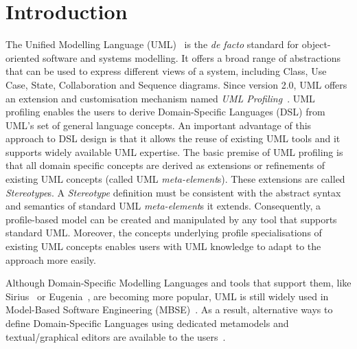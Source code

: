 \section{Introduction}
\label{sec:introduction}

The Unified Modelling Language (UML)~\cite{UML2015OMG} is the \emph{de facto} standard for object-oriented software and systems modelling. 
It offers a broad range of abstractions that can be used to express different views of a system, including Class, Use Case, State, Collaboration and Sequence diagrams. 
Since version 2.0, UML offers an extension and customisation mechanism named \emph{UML Profiling}~\cite{FuentesFernandez2004:UMLME}.
UML profiling enables the users to derive Domain-Specific Languages (DSL) from UML's set of general language concepts.
An important advantage of this approach to DSL design is that it allows the reuse of existing UML tools and it supports widely available UML expertise.
The basic premise of UML profiling is that all domain specific concepts are derived as extensions or refinements of existing UML concepts (called UML \textit{meta-element}s). 
These extensions are called \textit{Stereotype}s. 
A \textit{Stereotype} definition must be consistent with the abstract syntax and semantics of standard UML \textit{meta-element}s it extends. 
Consequently, a profile-based model can be created and manipulated by any tool that supports standard UML. 
Moreover, the concepts underlying profile specialisations of existing UML concepts enables users with UML knowledge to adapt to the approach more easily.

Although Domain-Specific Modelling Languages and tools that support them, like Sirius~\cite{viyovic2014sirius} or Eugenia~\cite{kolovos2015eugenia}, are becoming more popular, UML is still widely used in Model-Based Software Engineering (MBSE)~\cite{erickson2007theoretical}. 
As a result, alternative ways to define Domain-Specific Languages using dedicated metamodels and textual/graphical editors are available to the users~\cite{Bergmayr2014:MODELS,Pardillo2010:MODELS}. 

